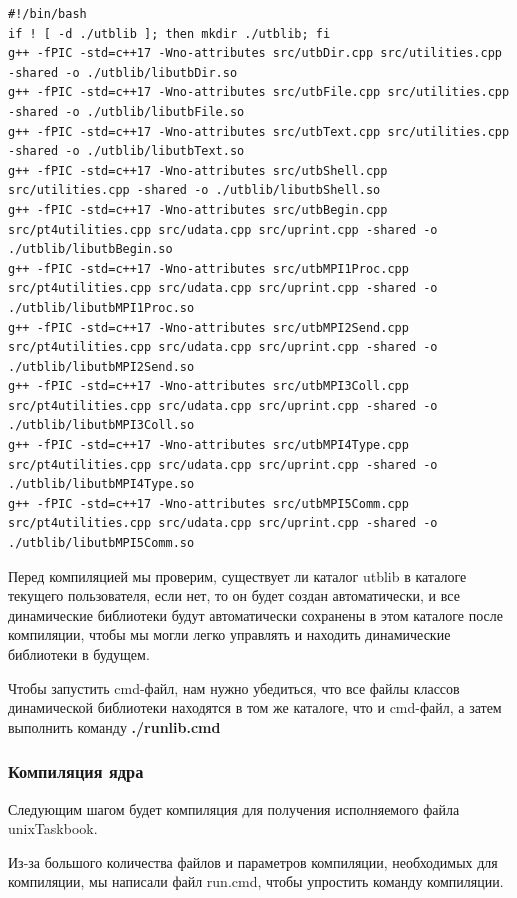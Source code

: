\lstset{language=bash}
\begin{lstlisting}
#!/bin/bash
if ! [ -d ./utblib ]; then mkdir ./utblib; fi
g++ -fPIC -std=c++17 -Wno-attributes src/utbDir.cpp src/utilities.cpp -shared -o ./utblib/libutbDir.so
g++ -fPIC -std=c++17 -Wno-attributes src/utbFile.cpp src/utilities.cpp -shared -o ./utblib/libutbFile.so
g++ -fPIC -std=c++17 -Wno-attributes src/utbText.cpp src/utilities.cpp -shared -o ./utblib/libutbText.so
g++ -fPIC -std=c++17 -Wno-attributes src/utbShell.cpp src/utilities.cpp -shared -o ./utblib/libutbShell.so
g++ -fPIC -std=c++17 -Wno-attributes src/utbBegin.cpp src/pt4utilities.cpp src/udata.cpp src/uprint.cpp -shared -o ./utblib/libutbBegin.so
g++ -fPIC -std=c++17 -Wno-attributes src/utbMPI1Proc.cpp src/pt4utilities.cpp src/udata.cpp src/uprint.cpp -shared -o ./utblib/libutbMPI1Proc.so
g++ -fPIC -std=c++17 -Wno-attributes src/utbMPI2Send.cpp src/pt4utilities.cpp src/udata.cpp src/uprint.cpp -shared -o ./utblib/libutbMPI2Send.so
g++ -fPIC -std=c++17 -Wno-attributes src/utbMPI3Coll.cpp src/pt4utilities.cpp src/udata.cpp src/uprint.cpp -shared -o ./utblib/libutbMPI3Coll.so
g++ -fPIC -std=c++17 -Wno-attributes src/utbMPI4Type.cpp src/pt4utilities.cpp src/udata.cpp src/uprint.cpp -shared -o ./utblib/libutbMPI4Type.so
g++ -fPIC -std=c++17 -Wno-attributes src/utbMPI5Comm.cpp src/pt4utilities.cpp src/udata.cpp src/uprint.cpp -shared -o ./utblib/libutbMPI5Comm.so
\end{lstlisting}

Перед компиляцией мы проверим, существует ли каталог utblib в каталоге текущего
 пользователя, если нет, то он будет создан автоматически, и все динамические
  библиотеки будут автоматически сохранены в этом каталоге после компиляции, чтобы 
  мы могли легко управлять и находить динамические библиотеки в будущем.

Чтобы запустить cmd-файл, нам нужно убедиться, что все файлы классов динамической 
библиотеки находятся в том же каталоге, что и cmd-файл, а затем выполнить команду \textbf{./runlib.cmd}

\subsubsection{Компиляция ядра}

Следующим шагом будет компиляция для получения исполняемого файла unixTaskbook.

Из-за большого количества файлов и параметров компиляции, необходимых для 
компиляции, мы написали файл run.cmd, чтобы упростить команду компиляции.

